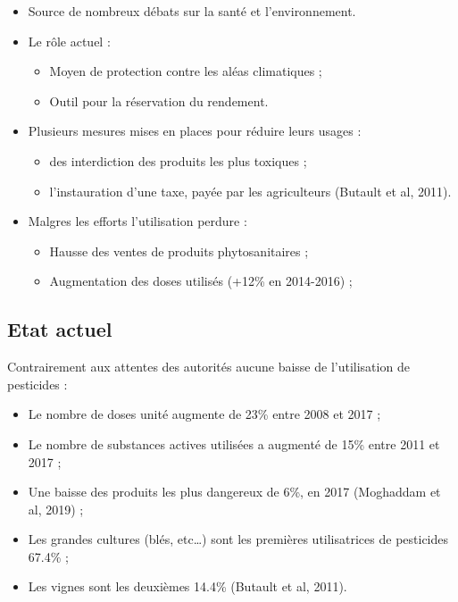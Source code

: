 \documentclass[11pt,]{article}
\providecommand{\tightlist}{%
  \setlength{\itemsep}{0pt}\setlength{\parskip}{0pt}}
\begin{document}
\begin{itemize}
\tightlist
\item
  Source de nombreux débats sur la santé et l'environnement.
\item
  Le rôle actuel :

  \begin{itemize}
  \tightlist
  \item
    Moyen de protection contre les aléas climatiques ;
  \item
    Outil pour la réservation du rendement.
  \end{itemize}
\item
  Plusieurs mesures mises en places pour réduire leurs usages :

  \begin{itemize}
  \tightlist
  \item
    des interdiction des produits les plus toxiques ;
  \item
    l'instauration d'une taxe, payée par les agriculteurs (Butault et
    al, 2011).
  \end{itemize}
\item
  Malgres les efforts l'utilisation perdure :

  \begin{itemize}
  \tightlist
  \item
    Hausse des ventes de produits phytosanitaires ;
  \item
    Augmentation des doses utilisés (+12\% en 2014-2016) ;
  \end{itemize}

  \FloatBarrier
\end{itemize}

\hypertarget{etat-actuel}{%
\subsection{Etat actuel}\label{etat-actuel}}

Contrairement aux attentes des autorités aucune baisse de l'utilisation
de pesticides :

\begin{itemize}
\item
  Le nombre de doses unité augmente de 23\% entre 2008 et 2017 ;
\item
  Le nombre de substances actives utilisées a augmenté de 15\% entre
  2011 et 2017 ;
\item
  Une baisse des produits les plus dangereux de 6\%, en 2017 (Moghaddam
  et al, 2019) ;
\item
  Les grandes cultures (blés, etc\ldots{}) sont les premières
  utilisatrices de pesticides 67.4\% ;
\item
  Les vignes sont les deuxièmes 14.4\% (Butault et al, 2011).

  \FloatBarrier
\end{itemize}
\end{document}

